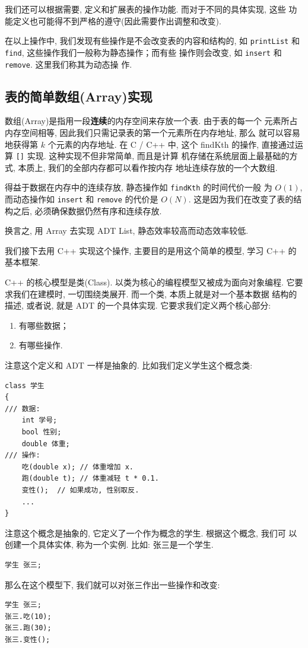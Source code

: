 \documentclass[a4paper]{ctexart}
\theoremstyle{definition}
\theoremstyle{definition}
\begin{document}
我们还可以根据需要, 定义和扩展表的操作功能. 而对于不同的具体实现, 这些
功能定义也可能得不到严格的遵守(因此需要作出调整和改变).

在以上操作中, 我们发现有些操作是不会改变表的内容和结构的, 如
\verb|printList| 和 \verb|find|, 这些操作我们一般称为静态操作；而有些
操作则会改变, 如 \verb|insert| 和 \verb|remove|. 这里我们称其为动态操
作.

\subsection{表的简单数组(Array)实现}
数组(Array)是指用一段{\bf 连续}的内存空间来存放一个表. 由于表的每一个
元素所占内存空间相等, 因此我们只需记录表的第一个元素所在内存地址, 那么
就可以容易地获得第 $k$ 个元素的内存地址. 在 C / C++ 中, 这个 findKth
的操作, 直接通过运算 \verb|[]| 实现. 这种实现不但非常简单, 而且是计算
机存储在系统层面上最基础的方式, 本质上, 我们的全部内存都可以看作按内存
地址连续存放的一个大数组.

得益于数据在内存中的连续存放, 静态操作如 \verb|findKth| 的时间代价一般
为 $O(1)$, 而动态操作如 \verb|insert| 和 \verb|remove| 的代价是
$O(N)$. 这是因为我们在改变了表的结构之后, 必须确保数据仍然有序和连续存放. 

换言之, 用 Array 去实现 ADT List, 静态效率较高而动态效率较低. 

我们接下去用 C++ 实现这个操作, 主要目的是用这个简单的模型, 学习 C++ 的
基本框架.

C++ 的核心模型是类(Class). 以类为核心的编程模型又被成为面向对象编程.
它要求我们在建模时, 一切围绕类展开. 而一个类, 本质上就是对一个基本数据
结构的描述, 或者说, 就是 ADT 的一个具体实现. 它要求我们定义两个核心部分:
\begin{enumerate}
\item 有哪些数据；
\item 有哪些操作.
\end{enumerate}
注意这个定义和 ADT 一样是抽象的. 比如我们定义学生这个概念类:
\begin{verbatim}
class 学生
{
/// 数据: 
    int 学号;
    bool 性别;
    double 体重;
/// 操作:
    吃(double x); // 体重增加 x.
    跑(double t); // 体重减轻 t * 0.1. 
    变性();  // 如果成功, 性别取反.
    ...
}
\end{verbatim}

注意这个概念是抽象的, 它定义了一个作为概念的学生. 根据这个概念, 我们可
以创建一个具体实体, 称为一个实例. 比如: 张三是一个学生.
\begin{verbatim}
学生 张三;
\end{verbatim}
那么在这个模型下, 我们就可以对张三作出一些操作和改变:
\begin{verbatim}
学生 张三;
张三.吃(10);
张三.跑(30);
张三.变性();
\end{verbatim}
\end{document}
